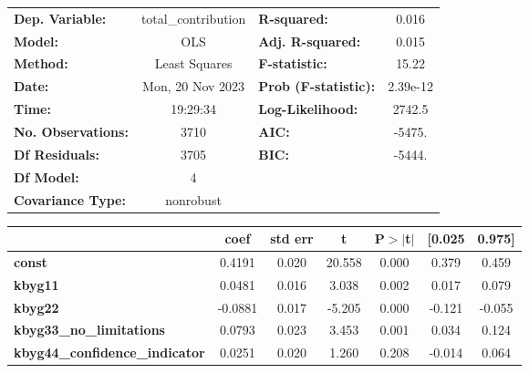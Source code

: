 \begin{center}
\begin{tabular}{lclc}
\toprule
\textbf{Dep. Variable:}                & total\_contribution & \textbf{  R-squared:         } &     0.016   \\
\textbf{Model:}                        &         OLS         & \textbf{  Adj. R-squared:    } &     0.015   \\
\textbf{Method:}                       &    Least Squares    & \textbf{  F-statistic:       } &     15.22   \\
\textbf{Date:}                         &   Mon, 20 Nov 2023  & \textbf{  Prob (F-statistic):} &  2.39e-12   \\
\textbf{Time:}                         &       19:29:34      & \textbf{  Log-Likelihood:    } &    2742.5   \\
\textbf{No. Observations:}             &          3710       & \textbf{  AIC:               } &    -5475.   \\
\textbf{Df Residuals:}                 &          3705       & \textbf{  BIC:               } &    -5444.   \\
\textbf{Df Model:}                     &             4       & \textbf{                     } &             \\
\textbf{Covariance Type:}              &      nonrobust      & \textbf{                     } &             \\
\bottomrule
\end{tabular}
\begin{tabular}{lcccccc}
                                       & \textbf{coef} & \textbf{std err} & \textbf{t} & \textbf{P$> |$t$|$} & \textbf{[0.025} & \textbf{0.975]}  \\
\midrule
\textbf{const}                         &       0.4191  &        0.020     &    20.558  &         0.000        &        0.379    &        0.459     \\
\textbf{kbyg11}                        &       0.0481  &        0.016     &     3.038  &         0.002        &        0.017    &        0.079     \\
\textbf{kbyg22}                        &      -0.0881  &        0.017     &    -5.205  &         0.000        &       -0.121    &       -0.055     \\
\textbf{kbyg33\_no\_limitations}       &       0.0793  &        0.023     &     3.453  &         0.001        &        0.034    &        0.124     \\
\textbf{kbyg44\_confidence\_indicator} &       0.0251  &        0.020     &     1.260  &         0.208        &       -0.014    &        0.064     \\

\end{tabular}
\end{center}
